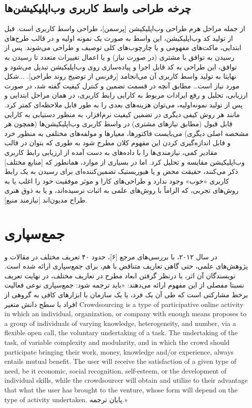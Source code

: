 \documentclass{report}
\theoremstyle{definition}
\begin{document}
\subsection{چرخه طراحی واسط کاربری وب‌اپلیکیشن‌ها}
از جمله مراحل هرم طراحی وب‌اپلیکیشن [پرسمن]، طراحی واسط کاربری است. قبل از تولید کد وب‌اپلیکیشن، این واسط به صورت یک نمونه اولیه و در قالب طرح‌های ابتدایی، ماکت‌های مفهومی و یا چارچوب‌های کلی توصیف و طراحی می‌شوند. پس از رسیدن به توافق با مشتری (در صورت نیاز) و یا اعمال تغییرات متعدد تا رسیدن به توافق، این طراحی به کد قابل اجرا و پیاده‌سازی روی وب‌اپلیکیشن تبدیل می‌شود و نهایتا به تولید واسط کاربری آن می‌انجامد [رفرنس از توضیح روند طراحی].
...شکل مورد نیاز است…
مطابق آنچه در قسمت تضمین و کنترل کیفیت گفته شد، در صورت ارزیابی، تحلیل و رفع ایرادات مربوط به کارایی رابط کاربری، در همان مراحل ابتدایی و پس از تولید نمونه‌اولیه، می‌توان هزینه‌های بعدی را به طور قابل ملاحظه‌ای کمتر کرد.
مانند هر روش کیفی دیگری در تضمین کیفیت نرم‌افزار، به منظور دستیابی به کارایی قابل قبول (مطابق نیازهای مشتری) در واسط کاربری وب‌اپلیکیشن‌ها (همچون هر مشخصه اصلی دیگری) می‌بایست فاکتورها، معیارها و مولفه‌های مختلفی به منظور خرد و قابل اندازه‌گیری کردن این مفهوم کلان مطرح شود به طوری که بتوان در قالب مقادیر کمی، نیازمندی‌ها را با داده‌های به دست آمده از ارزیابی رابط کاربری وب‌اپلیکیشن مقایسه و تحلیل کرد. اما در بسیاری از موارد، همانطور که [منابع مختلف] ذکر می‌کنند، حقیقت محض و یا هیوریستیک تضمین‌کننده‌ای برای رسیدن به یک رابط کاربری «خوب» وجود ندارد و طراحی‌های کارا و موثر موفقیت خود را اغلب یا به روش‌های تجربی، که الزاماً با روش‌های علمی به اثبات نرسیده‌اند، و یا به ذوق هنری طراح مدیون‌اند [نیازمند منبع].
\section{جمع‌سپاری}
در سال ۲۰۱۲، با بررسی‌های مرجع [۶]، حدود ۴۰ تعریف مختلف در مقالات و پژوهش‌های علمی، حتی گاهی تعاریف متناقض با هم، برای جمع‌سپاری ارائه شده است. نویسندگان آن اثر، با درنظر گرفتن ابعاد مطرح در تعاریف مختلف، در نهایت تعریف نسبتا مفصلی از این مفهوم ارائه می‌دهند:
«باید ترجمه شود: 
جمع‌سپاری نوعی فعالیت برخط مشارکتی است که طی آن یک فرد، یا یک سازمان با ابزارهای کافی به گروهی از افراد با سطح دانش متغیر 
Crowdsourcing is a type of participative online activity in which an individual, organization, or company with enough means proposes to a group of individuals of varying knowledge, heterogeneity, and number, via a flexible open call, the voluntary undertaking of a task. The undertaking of the task, of variable complexity and modularity, and in which the crowd should participate bringing their work, money, knowledge and/or experience, always entails mutual benefit. The user will receive the satisfaction of a given type of need, be it economic, social recognition, self-esteem, or the development of individual skills, while the crowdsourcer will obtain and utilize to their advantage that what the user has brought to the venture, whose form will depend on the type of activity undertaken.
پایان ترجمه.»
\end{document}
